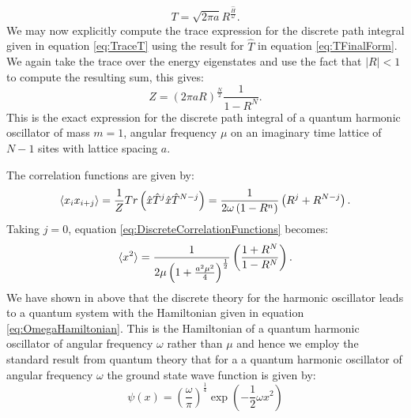 \documentclass[12pt]{article}
\begin{document}
\begin{equation}
	\label{eq:TFinalForm}
	T = \sqrt{2\pi a} R^{\frac{\hat{H}}{\omega}}.
\end{equation}
We may now explicitly compute the trace expression for the discrete path integral given in equation \ref{eq:TraceT} using the result for $\hat{T}$ in equation \ref{eq:TFinalForm}. We again take the trace over the energy eigenstates and use the fact that $|R|<1$ to compute the resulting sum, this gives:
\begin{equation}
	\label{eq:DiscretePathIntegral}
	Z = \left(2\pi aR\right)^{\frac{N}{2}}\frac{1}{1-R^N}.
\end{equation}
This is the exact expression for the discrete path integral of a quantum harmonic oscillator of mass $m=1$, angular frequency $\mu$ on an imaginary time lattice of $N-1$ sites with lattice spacing $a$.

The correlation functions are given by:
\begin{equation}
	\label{eq:DiscreteCorrelationFunctions}
	\braket{x_ix_{i+j}} = \frac{1}{Z}Tr\left(\hat{x}\hat{T}^j\hat{x}\hat{T}^{N-j}\right) = \frac{1}{2\omega\left(1-R^{n}\right)}\left(R^{j}+R^{N-j}\right).
\end{equation}
Taking $j=0$, equation \ref{eq:DiscreteCorrelationFunctions} becomes:
\begin{equation}
	\label{eq:XSquaredExpectation}
	\braket{x^2} = \frac{1}{2\mu\left(1+\frac{a^2\mu^2}{4}\right)^\frac{1}{2}}\left(\frac{1+R^N}{1-R^N}\right).
\end{equation}
We have shown in above that the discrete theory for the harmonic oscillator leads to a quantum system with the Hamiltonian given in equation \ref{eq:OmegaHamiltonian}. This is the Hamiltonian of a quantum harmonic oscillator of angular frequency $\omega$ rather than $\mu$ and hence we employ the standard result from quantum theory that for a a quantum harmonic oscillator of angular frequency $\omega$ the ground state wave function is given by: 
\begin{equation}
	\label{eq:DiscreteGroundStateWaveFunction2}
	\psi(x) =\left(\frac{\omega}{\pi}\right)^\frac{1}{4}\exp\left(-\frac{1}{2}\omega x^2\right)
\end{equation}
\end{document}
